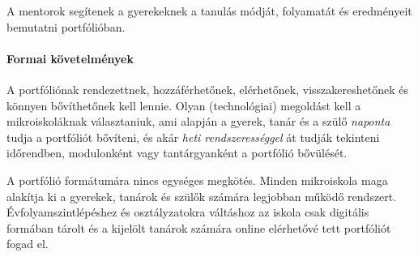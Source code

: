 A mentorok segítenek a gyerekeknek a tanulás módját, folyamatát és eredményeit bemutatni portfólióban.

\paragraph{Formai követelmények}
A portfóliónak rendezettnek, hozzáférhetőnek,\linebreak
elérhetőnek, visszakereshetőnek és könnyen bővíthetőnek kell
lennie.\linebreak
Olyan (technológiai) megoldást kell a mikroiskoláknak választaniuk, ami alapján a gyerek, tanár és a szülő \emph{naponta} tudja a portfóliót bővíteni, és akár \emph{heti rendszerességgel} át tudják tekinteni időrendben, modulonként vagy tantárgyanként a portfólió bővülését.

A portfólió formátumára nincs egységes megkötés. Minden mikroiskola maga alakítja ki a gyerekek, tanárok és szülők számára legjobban működő rendszert. Évfolyamszintlépéshez és osztályzatokra váltáshoz az iskola csak digitális formában tárolt és a kijelölt tanárok számára online elérhetővé tett portfóliót fogad el.

